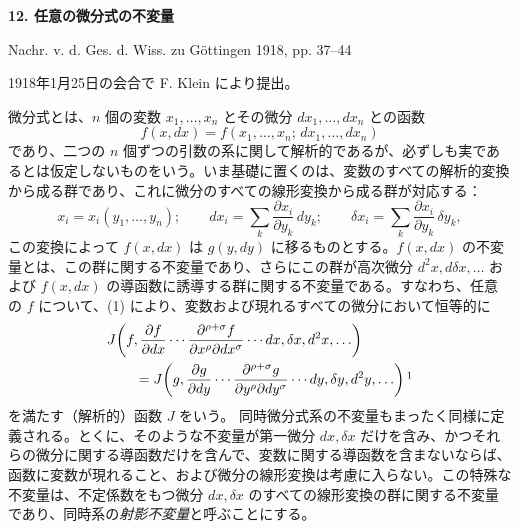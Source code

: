 \documentclass[11pt]{article}
\begin{document}
\clearpage

\begin{center}
{\Large\bfseries 12. 任意の微分式の不変量}\par
\vspace{1.5em}
Nachr. v. d. Ges. d. Wiss. zu Göttingen 1918, pp. 37--44
\end{center}

\vspace{3em}
\begin{center}
1918年1月25日の会合で F. Klein により提出。
\end{center}

微分式とは、\(n\) 個の変数 \(x_1,\ldots,x_n\) とその微分
\(dx_1,\ldots,dx_n\) との函数
\[
f(x,dx)=f(x_1,\ldots,x_n;\,dx_1,\ldots,dx_n)
\]
であり、二つの \(n\) 個ずつの引数の系に関して解析的であるが、必ずしも実であるとは仮定しないものをいう。いま基礎に置くのは、変数のすべての解析的変換から成る群であり、これに微分のすべての線形変換から成る群が対応する：
\begin{equation}
x_i=x_i(y_1,\ldots,y_n);\qquad
dx_i=\sum_k\frac{\partial x_i}{\partial y_k}\,dy_k;\qquad
\delta x_i=\sum_k\frac{\partial x_i}{\partial y_k}\,\delta y_k,
\tag{1}
\end{equation}
この変換によって \(f(x,dx)\) は \(g(y,dy)\) に移るものとする。\(f(x,dx)\) の不変量とは、この群に関する不変量であり、さらにこの群が高次微分 \(d^2x,d\delta x,\ldots\) および \(f(x,dx)\) の導函数に誘導する群に関する不変量である。すなわち、任意の \(f\) について、(1) により、変数および現れるすべての微分において恒等的に
\[
\begin{aligned}
&J\!\left(f,\frac{\partial f}{\partial dx}\cdots
\frac{\partial^{\rho+\sigma}f}{\partial x^\rho\partial dx^\sigma}
\cdots dx,\delta x,d^2x,\ldots\right)\\
&\qquad =
J\!\left(g,\frac{\partial g}{\partial dy}\cdots
\frac{\partial^{\rho+\sigma}g}{\partial y^\rho\partial dy^\sigma}
\cdots dy,\delta y,d^2y,\ldots\right)\footnotemark
\end{aligned}
\]
を満たす（解析的）函数 \(J\) をいう。
同時微分式系の不変量もまったく同様に定義される。とくに、そのような不変量が第一微分 \(dx,\delta x\) だけを含み、かつそれらの微分に関する導函数だけを含んで、変数に関する導函数を含まないならば、函数に変数が現れること、および微分の線形変換は考慮に入らない。この特殊な不変量は、不定係数をもつ微分 \(dx,\delta x\) のすべての線形変換の群に関する不変量であり、同時系の\emph{射影不変量}と呼ぶことにする。
\end{document}
